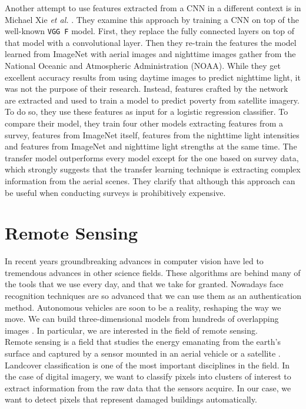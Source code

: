 Another attempt to use features extracted from a CNN in a different context is in Michael Xie \textit{et al.} \cite{DBLP:journals/corr/XieJBLE15}. They examine this approach by training a CNN on top of the well-known \texttt{VGG F} model. First, they replace the fully connected layers on top of that model with a convolutional layer. Then they re-train the features the model learned from ImageNet with aerial images and nighttime images gather from the National Oceanic and Atmospheric Administration (NOAA). While they get excellent accuracy results from using daytime images to predict nighttime light, it was not the purpose of their research. Instead, features crafted by the network are extracted and used to train a model to predict poverty from satellite imagery. To do so, they use these features as input for a logistic regression classifier. To compare their model, they train four other models extracting features from a survey, features from ImageNet itself, features from the nighttime light intensities and features from ImageNet and nighttime light strengths at the same time. The transfer model outperforms every model except for the one based on survey data, which strongly suggests that the transfer learning technique is extracting complex information from the aerial scenes. They clarify that although this approach can be useful when conducting surveys is prohibitively expensive.\\

\section{Remote Sensing}

In recent years groundbreaking advances in computer vision have led to tremendous advances in other science fields. These algorithms are behind many of the tools that we use every day, and that we take for granted. Nowadays face recognition techniques are so advanced that we can use them as an authentication method. Autonomous vehicles are soon to be a reality, reshaping the way we move. We can build three-dimensional models from hundreds of overlapping images \cite{Szeliski:2010:CVA:1941882}. In particular, we are interested in the field of remote sensing.\\

Remote sensing is a field that studies the energy emanating from the earth's surface and captured by a sensor mounted in an aerial vehicle or a satellite \cite{richards2013remote}. Landcover classification is one of the most important disciplines in the field. In the case of digital imagery, we want to classify pixels into clusters of interest to extract information from the raw data that the sensors acquire. In our case, we want to detect pixels that represent damaged buildings automatically.\\

